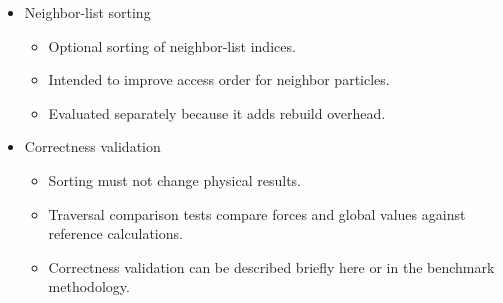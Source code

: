 \begin{itemize}
    \item Neighbor-list sorting
    \begin{itemize}
        \item Optional sorting of neighbor-list indices.
        \item Intended to improve access order for neighbor particles.
        \item Evaluated separately because it adds rebuild overhead.
    \end{itemize}

    \item Correctness validation
    \begin{itemize}
        \item Sorting must not change physical results.
        \item Traversal comparison tests compare forces and global values against reference calculations.
        \item Correctness validation can be described briefly here or in the benchmark methodology.
    \end{itemize}
\end{itemize}
